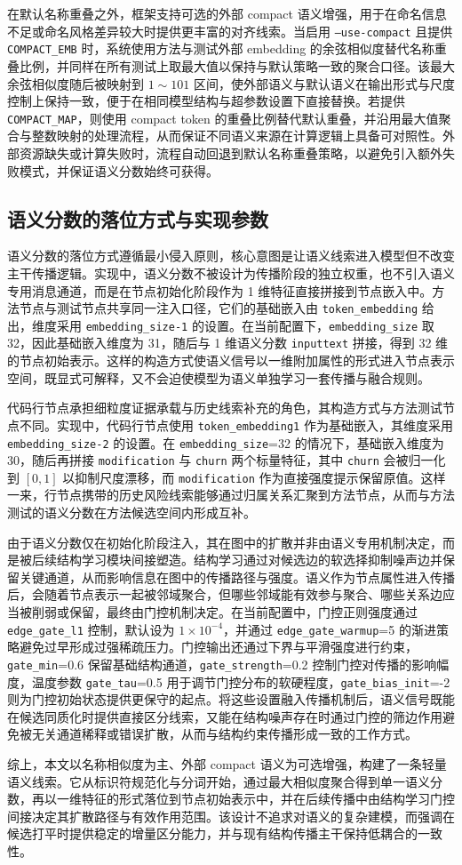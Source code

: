 在默认名称重叠之外，框架支持可选的外部 compact 语义增强，用于在命名信息不足或命名风格差异较大时提供更丰富的对齐线索。当启用 \texttt{--use-compact} 且提供 \texttt{COMPACT\_EMB} 时，系统使用方法与测试外部 embedding 的余弦相似度替代名称重叠比例，并同样在所有测试上取最大值以保持与默认策略一致的聚合口径。该最大余弦相似度随后被映射到 $1\!\sim\!101$ 区间，使外部语义与默认语义在输出形式与尺度控制上保持一致，便于在相同模型结构与超参数设置下直接替换。若提供 \texttt{COMPACT\_MAP}，则使用 compact token 的重叠比例替代默认重叠，并沿用最大值聚合与整数映射的处理流程，从而保证不同语义来源在计算逻辑上具备可对照性。外部资源缺失或计算失败时，流程自动回退到默认名称重叠策略，以避免引入额外失败模式，并保证语义分数始终可获得。

\subsection{语义分数的落位方式与实现参数}

语义分数的落位方式遵循最小侵入原则，核心意图是让语义线索进入模型但不改变主干传播逻辑。实现中，语义分数不被设计为传播阶段的独立权重，也不引入语义专用消息通道，而是在节点初始化阶段作为 1 维特征直接拼接到节点嵌入中。方法节点与测试节点共享同一注入口径，它们的基础嵌入由 \texttt{token\_embedding} 给出，维度采用 \texttt{embedding\_size-1} 的设置。在当前配置下，\texttt{embedding\_size} 取 32，因此基础嵌入维度为 31，随后与 1 维语义分数 \texttt{inputtext} 拼接，得到 32 维的节点初始表示。这样的构造方式使语义信号以一维附加属性的形式进入节点表示空间，既显式可解释，又不会迫使模型为语义单独学习一套传播与融合规则。

代码行节点承担细粒度证据承载与历史线索补充的角色，其构造方式与方法测试节点不同。实现中，代码行节点使用 \texttt{token\_embedding1} 作为基础嵌入，其维度采用 \texttt{embedding\_size-2} 的设置。在 \texttt{embedding\_size}=32 的情况下，基础嵌入维度为 30，随后再拼接 \texttt{modification} 与 \texttt{churn} 两个标量特征，其中 \texttt{churn} 会被归一化到 $[0,1]$ 以抑制尺度漂移，而 \texttt{modification} 作为直接强度提示保留原值。这样一来，行节点携带的历史风险线索能够通过归属关系汇聚到方法节点，从而与方法测试的语义分数在方法候选空间内形成互补。

由于语义分数仅在初始化阶段注入，其在图中的扩散并非由语义专用机制决定，而是被后续结构学习模块间接塑造。结构学习通过对候选边的软选择抑制噪声边并保留关键通道，从而影响信息在图中的传播路径与强度。语义作为节点属性进入传播后，会随着节点表示一起被邻域聚合，但哪些邻域能有效参与聚合、哪些关系边应当被削弱或保留，最终由门控机制决定。在当前配置中，门控正则强度通过 \texttt{edge\_gate\_l1} 控制，默认设为 $1\times10^{-4}$，并通过 \texttt{edge\_gate\_warmup}=5 的渐进策略避免过早形成过强稀疏压力。门控输出还通过下界与平滑强度进行约束，\texttt{gate\_min}=0.6 保留基础结构通道，\texttt{gate\_strength}=0.2 控制门控对传播的影响幅度，温度参数 \texttt{gate\_tau}=0.5 用于调节门控分布的软硬程度，\texttt{gate\_bias\_init}=-2 则为门控初始状态提供更保守的起点。将这些设置融入传播机制后，语义信号既能在候选同质化时提供直接区分线索，又能在结构噪声存在时通过门控的筛边作用避免被无关通道稀释或错误扩散，从而与结构约束传播形成一致的工作方式。

综上，本文以名称相似度为主、外部 compact 语义为可选增强，构建了一条轻量语义线索。它从标识符规范化与分词开始，通过最大相似度聚合得到单一语义分数，再以一维特征的形式落位到节点初始表示中，并在后续传播中由结构学习门控间接决定其扩散路径与有效作用范围。该设计不追求对语义的复杂建模，而强调在候选打平时提供稳定的增量区分能力，并与现有结构传播主干保持低耦合的一致性。
